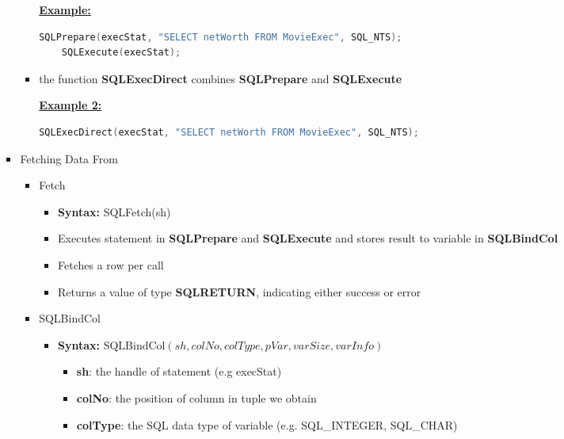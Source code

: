 \documentclass[12pt]{article}
\begin{document}
\begin{enumerate}[1.]
\begin{enumerate}[a)]
\begin{itemize}
\begin{itemize}
                \underline{\textbf{Example:}}

                \bigskip

    \begin{lstlisting}[language=c]
    SQLPrepare(execStat, "SELECT netWorth FROM MovieExec", SQL_NTS);
    SQLExecute(execStat);
    \end{lstlisting}
                \item the function \textbf{SQLExecDirect} combines \textbf{SQLPrepare} and \textbf{SQLExecute}

                \bigskip

                \underline{\textbf{Example 2:}}

                \bigskip

    \begin{lstlisting}[language=c]
    SQLExecDirect(execStat, "SELECT netWorth FROM MovieExec", SQL_NTS);
    \end{lstlisting}
            \end{itemize}
            \item Fetching Data From
            \begin{itemize}
                \item Fetch
                \begin{itemize}
                    \item \textbf{Syntax:} SQLFetch(sh)
                    \item Executes statement in \textbf{SQLPrepare} and \textbf{SQLExecute} and stores result
                    to variable in \textbf{SQLBindCol}
                    \item Fetches a row per call
                    \item Returns a value of type \textbf{SQLRETURN}, indicating either success or error
                \end{itemize}
                \item SQLBindCol
                \begin{itemize}
                    \item \textbf{Syntax:} $\text{SQLBindCol}(sh, colNo, colType, pVar, varSize, varInfo)$
                    \begin{itemize}
                        \item \textbf{sh}: the handle of statement (e.g execStat)
                        \item \textbf{colNo}: the position of column in tuple we obtain
                        \item \textbf{colType}: the SQL data type of variable (e.g. SQL\_INTEGER, SQL\_CHAR)

\end{itemize}
\end{itemize}
\end{itemize}
\end{itemize}
\end{enumerate}
\end{enumerate}
\end{document}
